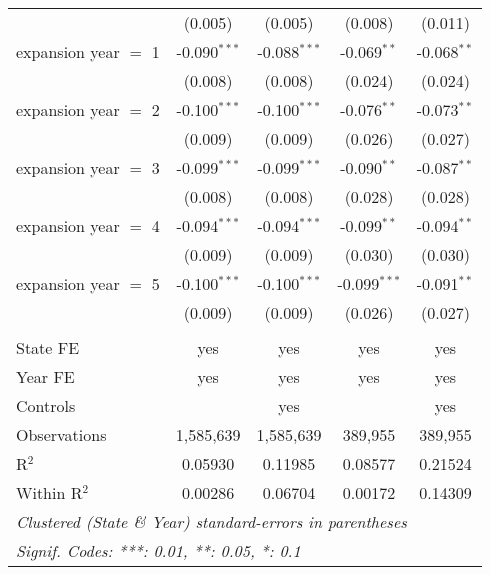 \documentclass[
]{article}
\begin{document}
\begin{table}[htbp]
\begin{tabular}{lcccc}
                            & (0.005)        & (0.005)                & (0.008)        & (0.011)\\   
      expansion year $=$ 1  & -0.090$^{***}$ & -0.088$^{***}$         & -0.069$^{**}$  & -0.068$^{**}$\\   
                            & (0.008)        & (0.008)                & (0.024)        & (0.024)\\   
      expansion year $=$ 2  & -0.100$^{***}$ & -0.100$^{***}$         & -0.076$^{**}$  & -0.073$^{**}$\\   
                            & (0.009)        & (0.009)                & (0.026)        & (0.027)\\   
      expansion year $=$ 3  & -0.099$^{***}$ & -0.099$^{***}$         & -0.090$^{**}$  & -0.087$^{**}$\\   
                            & (0.008)        & (0.008)                & (0.028)        & (0.028)\\   
      expansion year $=$ 4  & -0.094$^{***}$ & -0.094$^{***}$         & -0.099$^{**}$  & -0.094$^{**}$\\   
                            & (0.009)        & (0.009)                & (0.030)        & (0.030)\\   
      expansion year $=$ 5  & -0.100$^{***}$ & -0.100$^{***}$         & -0.099$^{***}$ & -0.091$^{**}$\\   
                            & (0.009)        & (0.009)                & (0.026)        & (0.027)\\   
       \\
      State FE              & yes            & yes                    & yes            & yes\\  
      Year FE               & yes            & yes                    & yes            & yes\\  
      Controls              &                & yes                    &                & yes\\  
      Observations          & 1,585,639      & 1,585,639              & 389,955        & 389,955\\  
      R$^2$                 & 0.05930        & 0.11985                & 0.08577        & 0.21524\\  
      Within R$^2$          & 0.00286        & 0.06704                & 0.00172        & 0.14309\\  
      \midrule \midrule
      \multicolumn{5}{l}{\emph{Clustered (State \& Year) standard-errors in parentheses}}\\
      \multicolumn{5}{l}{\emph{Signif. Codes: ***: 0.01, **: 0.05, *: 0.1}}\\
   \end{tabular}
\end{table}
\end{document}
